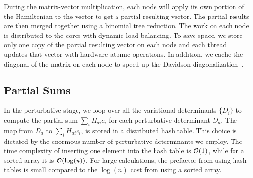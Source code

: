 \documentclass[%
preprint,
 superscriptaddress,
 amsmath,amssymb,
 aps,
]{revtex4-1}
\begin{document}
During the matrix-vector multiplication, each node will apply its own portion of the Hamiltonian to the vector to get a partial resulting vector.
The partial results are then merged together using a binomial tree reduction.
The work on each node is distributed to the cores with dynamic load balancing.
To save space, we store only one copy of the partial resulting vector on each node and each thread updates that vector with hardware atomic operations.
In addition, we cache the diagonal of the matrix on each node to speed up the Davidson diagonalization~\cite{Dav-CPC-89}.

\subsection{Partial Sums}
%
%

In the perturbative stage, we loop over all the variational determinants $\{D_i\}$ to compute the partial sum $\sum_i H_{ai}c_{i}$
for each perturbative determinant $D_a$.
The map from $D_a$ to $\sum_i H_{ai}c_{i}$, is stored in a distributed hash table.
This choice is dictated by the enormous number of perturbative determinants we employ.
The time complexity of inserting one element into the hash table is ${\cal O}(1)$, while for a sorted array it is ${\cal O}(\log(n))$.
For large calculations, the prefactor from using hash tables is small compared to the $\log(n)$ cost from using a sorted array.
\end{document}
